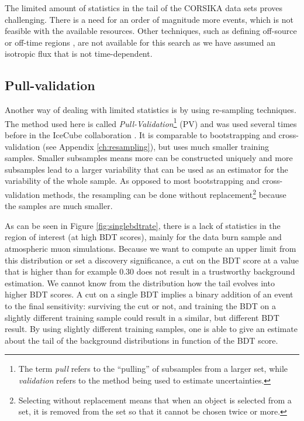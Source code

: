 \noindent The limited amount of statistics in the tail of the CORSIKA data sets proves challenging. There is a need for an order of magnitude more events, which is not feasible with the available resources. Other techniques, such as defining off-source or off-time regions \cite{1352676}, are not available for this search as we have assumed an isotropic flux that is not time-dependent.

\subsection{Pull-validation}
\label{subsec:pv}
Another way of dealing with limited statistics is by using re-sampling techniques. The method used here is called \textit{Pull-Validation}\footnote{The term \textit{pull} refers to the ``pulling'' of subsamples from a larger set, while \textit{validation} refers to the method being used to estimate uncertainties.} (PV) and was used several times before in the IceCube collaboration \cite{Aartsen:2016fep,Aartsen:2015exf,scheriauthesis}. It is comparable to bootstrapping and cross-validation (see Appendix \ref{ch:resampling}), but uses much smaller training samples. Smaller subsamples means more can be constructed uniquely and more subsamples lead to a larger variability that can be used as an estimator for the variability of the whole sample. As opposed to most bootstrapping and cross-validation methods, the resampling can be done without replacement\footnote{Selecting without replacement means that when an object is selected from a set, it is removed from the set so that it cannot be chosen twice or more.} because the samples are much smaller.

As can be seen in Figure \ref{fig:singlebdtrate}, there is a lack of statistics in the region of interest (at high BDT scores), mainly for the data burn sample and atmospheric muon simulations. Because we want to compute an upper limit from this distribution or set a discovery significance, a cut on the BDT score at a value that is higher than for example 0.30 does not result in a trustworthy background estimation. We cannot know from the distribution how the tail evolves into higher BDT scores. A cut on a single BDT implies a binary addition of an event to the final sensitivity: surviving the cut or not, and training the BDT on a slightly different training sample could result in a similar, but different BDT result. By using slightly different training samples, one is able to give an estimate about the tail of the background distributions in function of the BDT score.\\

